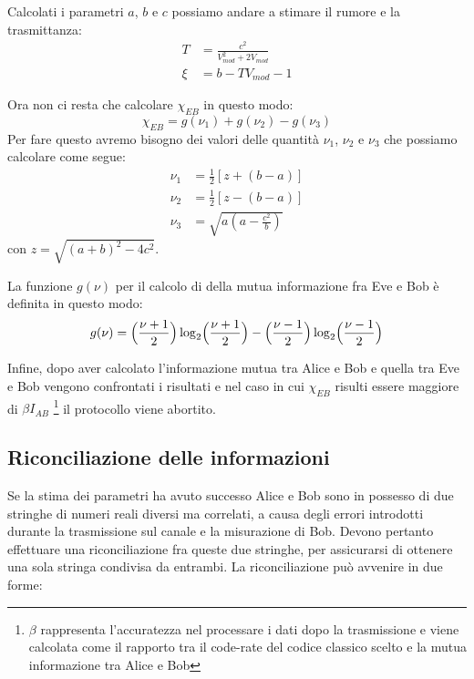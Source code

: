Calcolati i parametri $a$, $b$ e $c$ possiamo andare a stimare il rumore e la trasmittanza:
\begin{equation}
\begin{split}
T& = \frac{c^2}{V_{mod}^2 + 2V_{mod}} \\
\xi& = b - TV_{mod} -1
\end{split}
\end{equation}

Ora non ci resta che calcolare $\chi_{EB}$ in questo modo:
\begin{equation} \label{eq:EB-info}
\chi_{EB} = g(\nu_1) + g(\nu_2) - g(\nu_3)
\end{equation}
Per fare questo avremo bisogno dei valori delle quantit\`a $\nu_1$, $\nu_2$ e $\nu_3$ che possiamo calcolare come segue:
\begin{equation} \label{eq:nuCalc}
\begin{split}
\nu_1& = \frac{1}{2}[z + (b - a)] \\
\nu_2& = \frac{1}{2}[z - (b - a)] \\
\nu_3& = \sqrt{a (a - \frac{c^2}{b})}
\end{split}
\end{equation}
con $z = \sqrt{(a + b)^2 - 4 c^2}$.

La funzione $g(\nu)$ per il calcolo di della mutua informazione fra Eve e Bob \`e definita in questo modo:
\begin{equation} \label{eq:g}
g(\nu) = \Bigl (\frac{\nu + 1}{2}\Bigr ) \log_2 \Bigl (\frac{\nu + 1}{2}\Bigr ) - \Bigl (\frac{\nu - 1}{2}\Bigr ) \log_2 \Bigl (\frac{\nu - 1}{2}\Bigr )
\end{equation}

Infine, dopo aver calcolato l'informazione mutua tra Alice e Bob e quella tra Eve e Bob vengono confrontati i risultati e nel caso in cui $\chi_{EB}$ risulti essere maggiore di $\beta I_{AB}$ \footnote{$\beta$ rappresenta l'accuratezza nel processare i dati dopo la trasmissione e viene calcolata come il rapporto tra il code-rate del codice classico scelto e la mutua informazione tra Alice e Bob} il protocollo viene abortito.

\subsection{Riconciliazione delle informazioni}\label{subse:riconciliazione}
Se la stima dei parametri ha avuto successo Alice e Bob sono in possesso di due stringhe di numeri reali diversi ma correlati, a causa degli errori introdotti durante la trasmissione sul canale e la misurazione di Bob. Devono pertanto effettuare una riconciliazione fra queste due stringhe, per assicurarsi di ottenere una sola stringa condivisa da entrambi. La riconciliazione pu\`o avvenire in due forme: 

